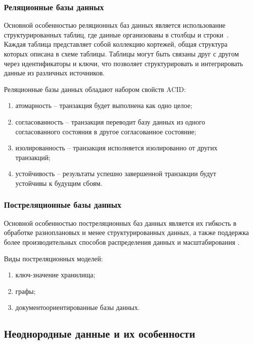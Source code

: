 \subsubsection{Реляционные базы данных}
 
Основной особенностью реляционных баз данных является использование структурированных таблиц, где данные организованы в столбцы и строки~\cite{kazan}.
Каждая таблица представляет собой коллекцию кортежей, общая структура которых описана в схеме таблицы. 
Таблицы могут быть связаны друг с другом через идентификаторы и ключи, что позволяет структурировать и интегрировать данные из различных источников.

Реляционные базы данных обладают набором свойств ACID:

\begin{enumerate}[wide=12.5mm, leftmargin=12.5mm]
	\item атомарность -- транзакция будет выполнена как одно целое;
	\item согласованность -- транзакция переводит базу данных из одного согласованного состояния в другое согласованное состояние;
	\item изолированность -- транзакция исполняется изолированно от других транзакций;
	\item устойчивость -- результаты успешно завершенной транзакции будут устойчивы к будущим сбоям.
\end{enumerate}

\subsubsection{Постреляционные базы данных}

Основной особенностью постреляционных баз данных является их гибкость в обработке разноплановых и менее структурированных данных, а также поддержка более производительных способов распределения данных и масштабирования \cite{kazan}.

Виды постреляционных моделей:

\begin{enumerate}[wide=12.5mm, leftmargin=12.5mm]
	\item ключ-значение хранилища;
	\item графы;
	\item документоориентированные базы данных.
\end{enumerate}

\clearpage
\subsection{Неоднородные данные и их особенности}

